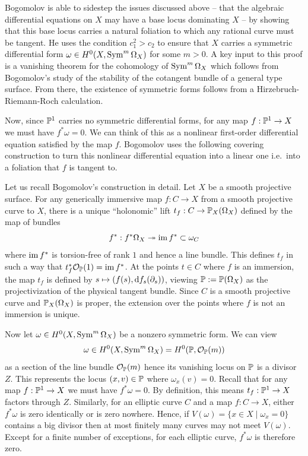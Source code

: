 \documentclass[main.tex]{subfiles}
\begin{document}
Bogomolov is able to sidestep the issues discussed above -- that the algebraic differential equations on $X$ may have a base locus dominating $X$ -- by showing that this base locus carries a natural foliation to which any rational curve must be tangent. He uses the condition $c_1^2 > c_2$ to ensure that $X$ carries a symmetric differential form $\omega \in H^0(X, \Sym^{m}{\Omega_X})$ for some $m > 0$. A key input to this proof is a vanishing theorem for the cohomology of $\Sym^{m}{\Omega_X}$ which follows from Bogomolov's study of the stability of the cotangent bundle of a general type surface. From there, the existence of symmetric forms follows from a Hirzebruch-Riemann-Roch calculation. 
\par 
Now, since $\P^1$ carries no symmetric differential forms, for any map $f : \P^1 \to X$ we must have $f^* \omega = 0$. We can think of this as a nonlinear first-order differential equation satisfied by the map $f$. Bogomolov uses the following covering construction to turn this nonlinear differential equation into a linear one i.e.\ into a foliation that $f$ is tangent to. 
\par
Let us recall Bogomolov's construction in detail. Let $X$ be a smooth projective surface. For any generically immersive map $f : C \to X$ from a smooth projective curve to $X$, there is a unique ``holonomic'' lift $t_f : C \to \P_X(\Omega_X)$ defined by the map of bundles
\[ f^* : f^* \Omega_X \onto \im{f^*} \subset \omega_C \]
where $\im{f^*}$ is torsion-free of rank $1$ and hence a line bundle. This defines $t_f$ in such a way that $t_f^* \cO_{\P}(1) = \im{f^*}$. At the points $t \in C$ where $f$ is an immersion, the map $t_f$ is defined by $s \mapsto (f(s), \d{f}_s(\partial_s))$, viewing $\P := \P(\Omega_X)$ as the projectivization of the physical tangent bundle. Since $C$ is a smooth projective curve and $\P_X(\Omega_X)$ is proper, the extension over the points where $f$ is not an immersion is unique. 
\par 
Now let $\omega \in H^0(X, \Sym^{m}{\Omega_X})$ be a nonzero symmetric form. We can view
\[ \omega \in H^0(X, \Sym^{m}{\Omega_X}) = H^0(\P, \cO_{\P}(m)) \]
as a section of the line bundle $\cO_{\P}(m)$ hence its vanishing locus on $\P$ is a divisor $Z$. This represents the locus $(x, v) \in \P$ where $\omega_x(v) = 0$. Recall that for any map $f : \P^1 \to X$ we must have $f^* \omega = 0$. By definition, this means $t_f : \P^1 \to X$ factors through $Z$. Similarly, for an elliptic curve $C$ and a map $f : C \to X$, either $f^* \omega$ is zero identically or is zero nowhere. Hence, if $V(\omega) = \{x \in X \mid \omega_x = 0\}$ contains a big divisor then at most finitely many curves may not meet $V(\omega)$. Except for a finite number of exceptions, for each elliptic curve, $f^* \omega$ is therefore zero. 
\end{document}
